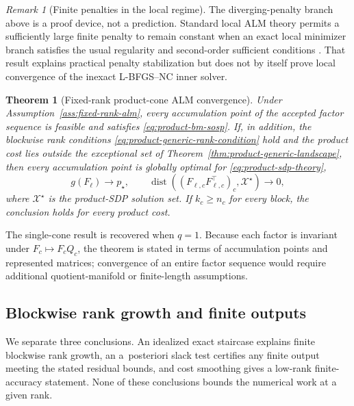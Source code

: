 \documentclass[11pt]{article}
\newtheorem{theorem}{Theorem}
\theoremstyle{definition}
\theoremstyle{remark}
\newtheorem{remark}{Remark}
\begin{document}
\begin{remark}[Finite penalties in the local regime]
\label{rem:finite-local-penalty}
The diverging-penalty branch above is a proof device, not a prediction.
Standard local ALM theory permits a sufficiently large finite penalty to
remain constant when an exact local minimizer branch satisfies the usual
regularity and second-order sufficient conditions
\cite[Proposition~2.7]{Bertsekas1982}.  That result explains practical
penalty stabilization but does not by itself prove local convergence of the
inexact L-BFGS--NC inner solver.
\end{remark}

\begin{theorem}[Fixed-rank product-cone ALM convergence]
\label{thm:product-fixed-rank-sosp}
Under Assumption~\ref{ass:fixed-rank-alm}, every accumulation point of the
accepted factor sequence is feasible and satisfies
\eqref{eq:product-bm-sosp}.  If, in addition, the blockwise rank conditions
\eqref{eq:product-generic-rank-condition} hold and the product cost lies
outside the exceptional set of
Theorem~\ref{thm:product-generic-landscape}, then every accumulation point is
globally optimal for \eqref{eq:product-sdp-theory},
\begin{equation}
  g(F_\ell)\to p_\star,
  \qquad
  \operatorname{dist}\!\left(
    (F_{\ell,c}F_{\ell,c}^\top)_c,\mathcal X^\star
  \right)\to0,
  \label{eq:matrix-sequence-to-solution-set}
\end{equation}
where $\mathcal X^\star$ is the product-SDP solution set.  If
$k_c\geq n_c$ for every block, the conclusion holds for every product cost.
\end{theorem}

The single-cone result is recovered when $q=1$.  Because each factor is
invariant under $F_c\mapsto F_cQ_c$, the theorem is stated in terms of
accumulation points and represented matrices; convergence of an entire factor
sequence would require additional quotient-manifold or finite-length
assumptions.

\subsection{Blockwise rank growth and finite outputs}
\label{subsec:rank-growth-finite-guarantees}

We separate three conclusions.  An idealized exact staircase explains finite
blockwise rank growth, an \mbox{a posteriori} slack test certifies any finite output
meeting the stated residual bounds, and cost smoothing gives a low-rank
finite-accuracy statement.  None of these conclusions bounds the numerical
work at a given rank.
\end{document}
